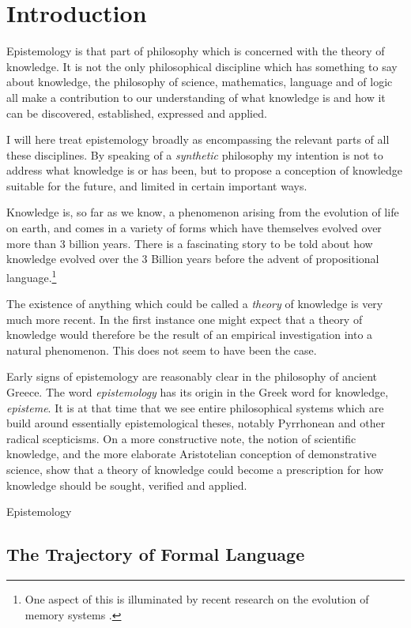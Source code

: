 \documentclass[10pt,titlepage]{book}
\begin{document}
\section{Introduction}

Epistemology is that part of philosophy which is concerned with the theory of knowledge.
It is not the only philosophical discipline which has something to say about knowledge, the philosophy of science, mathematics, language and of logic all make a contribution to our understanding of what knowledge is and how it can be discovered, established, expressed and applied.

I will here treat epistemology broadly as encompassing the relevant parts of all these disciplines.
By speaking of a \emph{synthetic} philosophy my intention is not to address what knowledge is or has been, but to propose a conception of knowledge suitable for the future, and limited in certain important ways.

Knowledge is, so far as we know, a phenomenon arising from the evolution of life on earth, and comes in a variety of forms which have themselves evolved over more than 3 billion years.
There is a fascinating story to be told about how knowledge evolved over the 3 Billion years before the advent of propositional language.\footnote{One aspect of this is illuminated by recent research on the evolution of memory systems \cite{murray2017evolution}.}

The existence of anything which could be called a \emph{theory} of knowledge is very much more recent.
In the first instance one might expect that a theory of knowledge would therefore be the result of an empirical investigation into a natural phenomenon.
This does not seem to have been the case.

Early signs of epistemology are reasonably clear in the philosophy of ancient Greece.
The word \emph{epistemology} has its origin in the Greek word for knowledge, \emph{episteme}.
 It is at that time that we see entire philosophical systems which are build around essentially epistemological theses, notably Pyrrhonean and other radical scepticisms.
 On a more constructive note, the notion of scientific knowledge, and the more elaborate Aristotelian conception of demonstrative science, show that a theory of knowledge could become a prescription for how knowledge should be sought, verified and applied.

Epistemology 
 

 \subsection{The Trajectory of Formal Language}
\end{document}
